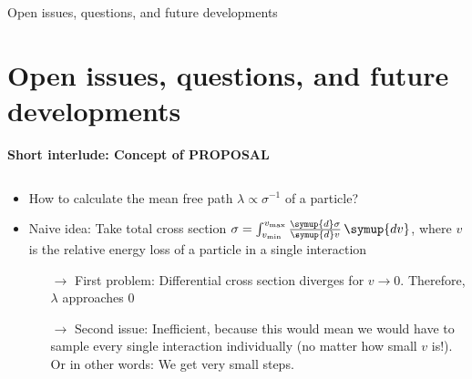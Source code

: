 \documentclass[aspectratio=1610, 9pt]{beamer}
\begin{document}
\begin{frame}
  \begin{center}
    \Huge Open issues, questions, and future developments
  \end{center}
\end{frame}

\section{Open issues, questions, and future developments}


\begin{frame}[c]

    \textbf{Short interlude: Concept of PROPOSAL}

    \begin{columns}[onlytextwidth]

      \begin{column}{0.5\textwidth}
        \begin{itemize}
            \item How to calculate the mean free path $\lambda \propto \sigma^{-1}$ of a particle?
            \item Naive idea: Take total cross section $\sigma = \int_{v_\text{min}}^{v_\text{max}} \frac{\symup{d}\sigma}{\symup{d}v}\, \symup{dv}$, where $v$ is the relative energy loss of a particle in a single interaction
            \begin{itemize}
                \item[$\rightarrow$] First problem: Differential cross section diverges for $v \rightarrow 0$. Therefore, $\lambda$ approaches $0$ 
                \item[$\rightarrow$] Second issue: Inefficient, because this would mean we would have to sample every single interaction individually (no matter how small $v$ is!). Or in other words: We get very small steps.
            \end{itemize}
        \end{itemize}
      \end{column}


\end{columns}
\end{frame}
\end{document}

